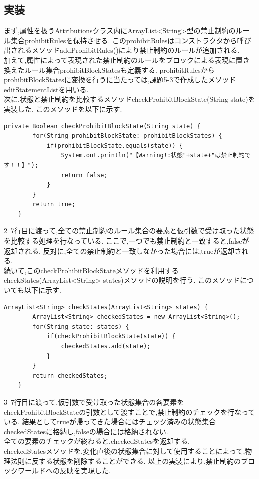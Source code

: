 \documentclass[uplatex,12pt]{jsarticle}
\begin{document}
\subsection{実装}
まず,属性を扱うAttributionsクラス内にArrayList<String>型の禁止制約のルール集合prohibitRulesを保持させる.
このprohibitRulesはコンストラクタから呼び出されるメソッドaddProhibitRules()により禁止制約のルールが追加される. \\
加えて,属性によって表現された禁止制約のルールをブロックによる表現に置き換えたルール集合prohibitBlockStatesも定義する.
prohibitRulesからprohibitBlockStatesに変換を行うに当たっては,課題5-3で作成したメソッドeditStatementListを用いる. \\
次に,状態と禁止制約を比較するメソッドcheckProhibitBlockState(String state)を実装した.
このメソッドを以下に示す.
\begin{lstlisting}[caption=checkProhibitBlockStateメソッドの実装, label=mid]
    private Boolean checkProhibitBlockState(String state) {
		for(String prohibitBlockState: prohibitBlockStates) {
			if(prohibitBlockState.equals(state)) {
				System.out.println("【Warning!:状態"+state+"は禁止制約です！！】");
				return false;
			}
		}
		return true;
	}
\end{lstlisting}
2~7行目に渡って,全ての禁止制約のルール集合の要素と仮引数で受け取った状態を比較する処理を行なっている.
ここで,一つでも禁止制約と一致すると,falseが返却される.
反対に,全ての禁止制約と一致しなかった場合には,trueが返却される. \\
続いて,このcheckProhibitBlockStateメソッドを利用するcheckStates(ArrayList<String> states)メソッドの説明を行う.
このメソッドについても以下に示す.
\begin{lstlisting}[caption=checkStatesメソッドの実装, label=mid]
    ArrayList<String> checkStates(ArrayList<String> states) {
		ArrayList<String> checkedStates = new ArrayList<String>();
		for(String state: states) {
			if(checkProhibitBlockState(state)) {
				checkedStates.add(state);
			}
		}
		return checkedStates;
	}
\end{lstlisting}
3~7行目に渡って,仮引数で受け取った状態集合の各要素をcheckProhibitBlockStateの引数として渡すことで,禁止制約のチェックを行なっている.
結果としてtrueが帰ってきた場合にはチェック済みの状態集合checkedStatesに格納し,falseの場合には格納されない. \\
全ての要素のチェックが終わると,checkedStatesを返却する. \\
checkedStatesメソッドを,変化直後の状態集合に対して使用することによって,物理法則に反する状態を削除することができる.
以上の実装により,禁止制約のブロックワールドへの反映を実現した.
\end{document}
